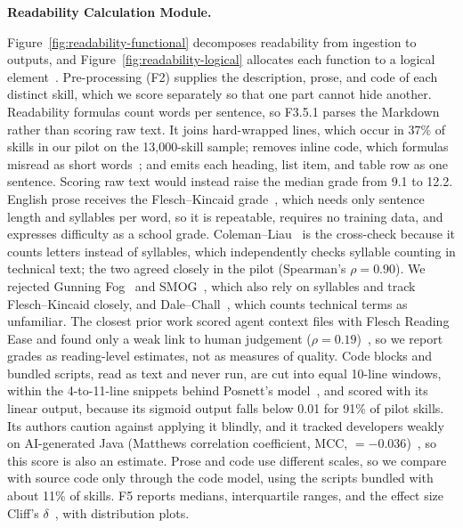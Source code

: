 \medskip

\noindent\textbf{Readability Calculation Module.}

Figure~\ref{fig:readability-functional} decomposes readability from ingestion to outputs, and Figure~\ref{fig:readability-logical} allocates each function to a logical element~\cite[Sec.~4.3]{nasa2016handbook}. Pre-processing (F2) supplies the description, prose, and code of each distinct skill, which we score separately so that one part cannot hide another.
Readability formulas count words per sentence, so F3.5.1 parses the Markdown rather than scoring raw text. It joins hard-wrapped lines, which occur in 37\% of skills in our pilot on the 13,000-skill sample; removes inline code, which formulas misread as short words~\cite{chatlatanagulchai2026agent}; and emits each heading, list item, and table row as one sentence. Scoring raw text would instead raise the median grade from 9.1 to 12.2.
English prose receives the Flesch--Kincaid grade~\cite{kincaid1975}, which needs only sentence length and syllables per word, so it is repeatable, requires no training data, and expresses difficulty as a school grade. Coleman--Liau~\cite{coleman1975} is the cross-check because it counts letters instead of syllables, which independently checks syllable counting in technical text; the two agreed closely in the pilot (Spearman's $\rho = 0.90$). We rejected Gunning Fog~\cite{gunning1952} and SMOG~\cite{mclaughlin1969smog}, which also rely on syllables and track Flesch--Kincaid closely, and Dale--Chall~\cite{chall1995}, which counts technical terms as unfamiliar. The closest prior work scored agent context files with Flesch Reading Ease and found only a weak link to human judgement ($\rho = 0.19$)~\cite{chatlatanagulchai2026agent}, so we report grades as reading-level estimates, not as measures of quality.
Code blocks and bundled scripts, read as text and never run, are cut into equal 10-line windows, within the 4-to-11-line snippets behind Posnett's model~\cite{posnett2011simpler}, and scored with its linear output, because its sigmoid output falls below 0.01 for 91\% of pilot skills. Its authors caution against applying it blindly, and it tracked developers weakly on AI-generated Java (Matthews correlation coefficient, MCC, $= -0.036$)~\cite{sergeyuk2024reassessing}, so this score is also an estimate. Prose and code use different scales, so we compare with source code only through the code model, using the scripts bundled with about 11\% of skills. F5 reports medians, interquartile ranges, and the effect size Cliff's $\delta$~\cite{cliff1993dominance}, with distribution plots.

